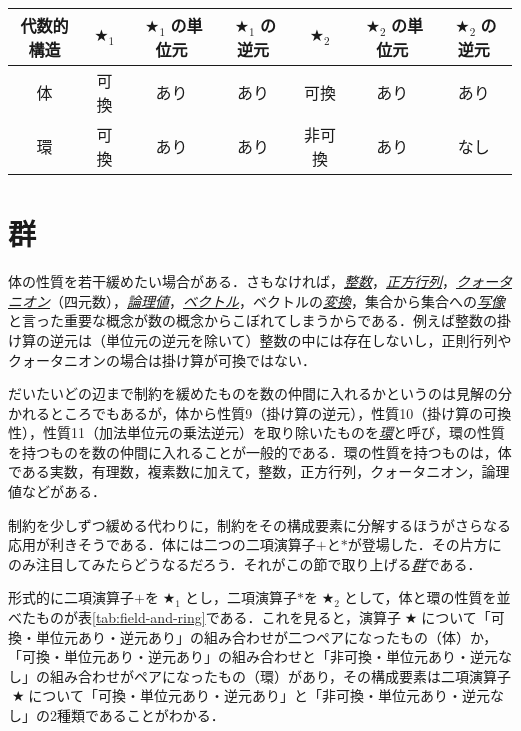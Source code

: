 \documentclass[a5paper,draft]{jsbook}
\newcommand{\keyword}[1]{{\underline{\emph{#1}}}}
\newcommand{\mathBinaryOperator}[1]{\operatorname{#1}}
\newcommand{\mathAnyBinaryOperator}{\mathBinaryOperator{\bigstar}}
\begin{document}
\begin{table*}
\caption{代表的な代数的構造の性質(1)}
\label{tab:field-and-ring}
\begin{center}
\begin{tabular}{||c||c|c|c|c|c|c||}
\hline
代数的構造&$\mathAnyBinaryOperator_1$&$\mathAnyBinaryOperator_1$の単位元&$\mathAnyBinaryOperator_1$の逆元&$\mathAnyBinaryOperator_2$&$\mathAnyBinaryOperator_2$の単位元&$\mathAnyBinaryOperator_2$の逆元\\
\hline\hline
体&可換&あり&あり&可換&あり&あり\\
環&可換&あり&あり&非可換&あり&なし\\
\hline
\end{tabular}
\end{center}
\end{table*}

\section{群}

体の性質を若干緩めたい場合がある．さもなければ，\keyword{整数}，\keyword{正方行列}，\keyword{クォータニオン}（四元数），\keyword{論理値}，\keyword{ベクトル}，ベクトルの\keyword{変換}，集合から集合への\keyword{写像}と言った重要な概念が数の概念からこぼれてしまうからである．例えば整数の掛け算の逆元は（単位元の逆元を除いて）整数の中には存在しないし，正則行列やクォータニオンの場合は掛け算が可換ではない．

だいたいどの辺まで制約を緩めたものを数の仲間に入れるかというのは見解の分かれるところでもあるが，体から性質9（掛け算の逆元），性質10（掛け算の可換性），性質11（加法単位元の乗法逆元）を取り除いたものを\keyword{環}と呼び，環の性質を持つものを数の仲間に入れることが一般的である．環の性質を持つものは，体である実数，有理数，複素数に加えて，整数，正方行列，クォータニオン，論理値などがある．

制約を少しずつ緩める代わりに，制約をその構成要素に分解するほうがさらなる応用が利きそうである．体には二つの二項演算子$+$と$*$が登場した．その片方にのみ注目してみたらどうなるだろう．それがこの節で取り上げる\keyword{群}である．

形式的に二項演算子$+$を$\mathAnyBinaryOperator_1$とし，二項演算子$*$を$\mathAnyBinaryOperator_2$として，体と環の性質を並べたものが表\ref{tab:field-and-ring}である．これを見ると，演算子$\mathAnyBinaryOperator$について「可換・単位元あり・逆元あり」の組み合わせが二つペアになったもの（体）か，「可換・単位元あり・逆元あり」の組み合わせと「非可換・単位元あり・逆元なし」の組み合わせがペアになったもの（環）があり，その構成要素は二項演算子$\mathAnyBinaryOperator$について「可換・単位元あり・逆元あり」と「非可換・単位元あり・逆元なし」の2種類であることがわかる．
\end{document}
